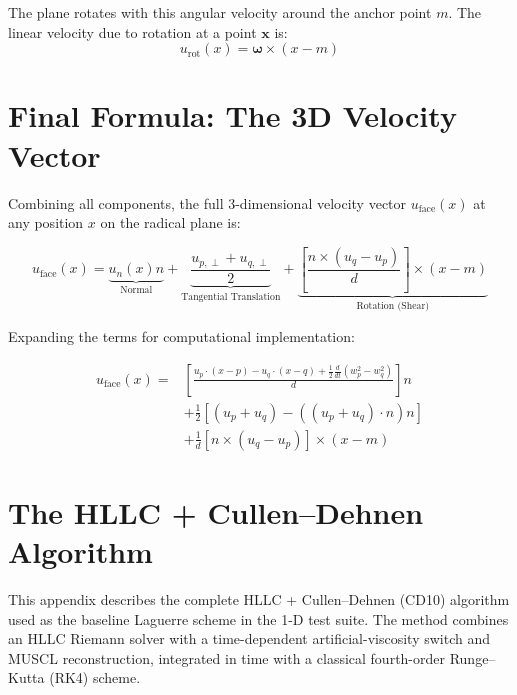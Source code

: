 \documentclass[twocolumn]{aastex63}
\newcommand{\vect}[1]{\mathbf{#1}}
\begin{document}
The plane rotates with this angular velocity around the anchor point ${m}$. The linear velocity due to rotation at a point $\vect{x}$ is:
\begin{equation}
    {u}_\textrm{rot}({x}) = \boldsymbol{\omega} \times ({x} - {m})
\end{equation}

\section{Final Formula: The 3D Velocity Vector}

Combining all components, the full 3-dimensional velocity vector ${u}_\textrm{face}({x})$ at any position ${x}$ on the radical plane is:

\begin{equation}
    u_\textrm{face}({x}) = 
    \underbrace{u_n({x}) {n}}_{\text{Normal}} + 
    \underbrace{\frac{{u}_{p,\perp} + {u}_{q,\perp}}{2}}_{\text{Tangential Translation}} + 
    \underbrace{\left[ \frac{{n} \times ({u}_q - {u}_p)}{d} \right] \times ({x} - {m})}_{\text{Rotation (Shear)}}
\end{equation}

Expanding the terms for computational implementation:

\begin{equation}
\boxed{
\begin{aligned}
    {u}_\textrm{face}({x}) = 
    & \left[ \frac{{u}_p \cdot ({x} - {p}) - {u}_q \cdot ({x} - {q}) + \frac{1}{2}\frac{d}{dt}(w_p^2 - w_q^2)}{d} \right] {n} \\
    & + \frac{1}{2} \left[ ({u}_p + {u}_q) - \left( ({u}_p + {u}_q) \cdot {n} \right) {n} \right] \\
    & + \frac{1}{d} \left[ {n} \times ({u}_q - {u}_p) \right] \times ({x} - {m})
\end{aligned}
}
\end{equation}


\section{The HLLC + Cullen--Dehnen Algorithm} \label{app:hllccd}

This appendix describes the complete HLLC + Cullen--Dehnen (CD10) algorithm
used as the baseline Laguerre scheme in the 1-D test suite.
The method combines an HLLC Riemann solver with a
time-dependent artificial-viscosity switch and MUSCL reconstruction,
integrated in time with a classical fourth-order Runge--Kutta (RK4) scheme.
\end{document}
